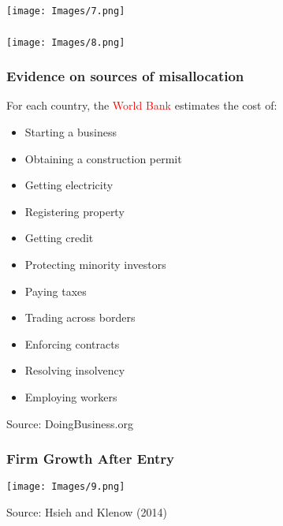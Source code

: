 \documentclass[serif,professionalfont,red,aspectratio=169]{beamer}
\begin{document}
\begin{frame}[t]
\frametitle{}
\begin{center}
\texttt{[image: Images/7.png]}
\end{center}
\end{frame}
\begin{frame}[t]
\frametitle{}
\begin{center}
\texttt{[image: Images/8.png]}
\end{center}
\end{frame}
\begin{frame}[t]
\frametitle{Evidence on sources of misallocation} 
For each country, the \textcolor{red}{World Bank} estimates the cost of:
\begin{itemize}
\vspace{2mm}
\item Starting a business
\vspace{1mm}
\item Obtaining a construction permit 
\vspace{1mm}
\item Getting electricity
\vspace{1mm}
\item Registering property
\vspace{1mm}
\item  Getting credit
\vspace{1mm}
\item Protecting minority investors
\vspace{1mm}
\item Paying taxes
\vspace{1mm}
\item Trading across borders
\vspace{1mm}
\item Enforcing contracts
\vspace{1mm}
\item Resolving insolvency
\vspace{1mm}
\item Employing workers
\end{itemize}
\vspace{2mm}
Source: DoingBusiness.org
\end{frame}
\begin{frame}[t]
\frametitle{Firm Growth After Entry}
\begin{center}
\texttt{[image: Images/9.png]}
\end{center}
\small{Source: Hsieh and Klenow (2014)}
\end{frame}
\end{document}
